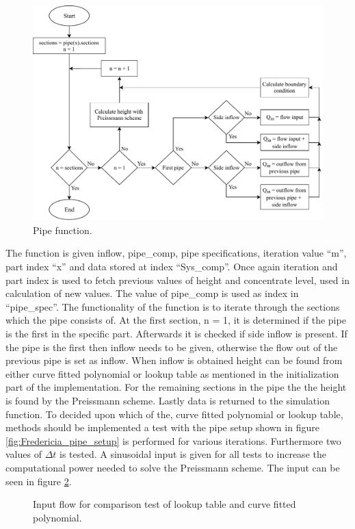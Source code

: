 \begin{figure}[H]
\centering
\includegraphics[width=0.9 \textwidth]{report/simulation/pictures/pipe_function.pdf}
\caption{Pipe function.}
\label{fig:pipe_function}
\end{figure}

The function is given inflow, pipe\_comp, pipe specifications, iteration value ``m'', part index ``x'' and data stored at index ``Sys\_comp''.
Once again iteration and part index is used to fetch previous values of height and concentrate level, used in calculation of new values. The value of pipe\_comp is used as index in ``pipe\_spec''. The functionality of the function is to iterate through the sections which the pipe consists of.
At the first section, n = 1, it is determined if the pipe is the first in the specific part. Afterwards it is checked if side inflow is present. If the pipe is the first then inflow needs to be given, otherwise the flow out of the previous pipe is set as inflow. When inflow is obtained height can be found from either curve fitted polynomial or lookup table as mentioned in the initialization part of the implementation. For the remaining sections in the pipe the the height is found by the Preissmann scheme. Lastly data is returned to the simulation function.
To decided upon which of the, curve fitted polynomial or lookup table, methods should be implemented a test with the pipe setup shown in figure \ref{fig:Fredericia_pipe_setup} is performed for various iterations. Furthermore two values of $\Delta t$ is tested. A  sinusoidal input is given for all tests to increase the computational power needed to solve the Preissmann scheme. The input can be seen in figure \ref{fig:comparison_look_fit_input}.
\begin{figure}[H]
 \centering
 
\caption{Input flow for comparison test of lookup table and curve fitted polynomial.}
\label{fig:comparison_look_fit_input}
\end{figure} 

